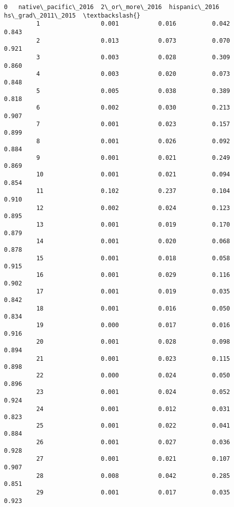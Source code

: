 \documentclass[11pt]{article}
\begin{document}
\begin{Verbatim}[commandchars=\\\{\}]
         0   native\_pacific\_2016  2\_or\_more\_2016  hispanic\_2016  hs\_grad\_2011\_2015  \textbackslash{}
         1                 0.001           0.016          0.042              0.843   
         2                 0.013           0.073          0.070              0.921   
         3                 0.003           0.028          0.309              0.860   
         4                 0.003           0.020          0.073              0.848   
         5                 0.005           0.038          0.389              0.818   
         6                 0.002           0.030          0.213              0.907   
         7                 0.001           0.023          0.157              0.899   
         8                 0.001           0.026          0.092              0.884   
         9                 0.001           0.021          0.249              0.869   
         10                0.001           0.021          0.094              0.854   
         11                0.102           0.237          0.104              0.910   
         12                0.002           0.024          0.123              0.895   
         13                0.001           0.019          0.170              0.879   
         14                0.001           0.020          0.068              0.878   
         15                0.001           0.018          0.058              0.915   
         16                0.001           0.029          0.116              0.902   
         17                0.001           0.019          0.035              0.842   
         18                0.001           0.016          0.050              0.834   
         19                0.000           0.017          0.016              0.916   
         20                0.001           0.028          0.098              0.894   
         21                0.001           0.023          0.115              0.898   
         22                0.000           0.024          0.050              0.896   
         23                0.001           0.024          0.052              0.924   
         24                0.001           0.012          0.031              0.823   
         25                0.001           0.022          0.041              0.884   
         26                0.001           0.027          0.036              0.928   
         27                0.001           0.021          0.107              0.907   
         28                0.008           0.042          0.285              0.851   
         29                0.001           0.017          0.035              0.923   

\end{Verbatim}
\end{document}
